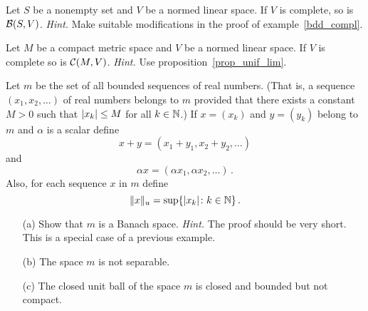 \begin{prob}\label{prob_BSV_compl}  Let $S$ be a nonempty set and $V$ be a normed linear space.
If $V$ is complete, so is $\mathcal{B}(S,V)$.   \emph{Hint.}  Make suitable modifications in the
proof of example~\ref{bdd_compl}.
\end{prob}

\begin{prob}  Let $M$ be a compact metric space and $V$ be a normed linear space.  If $V$ is
complete so is $\mathcal{C}(M,V)$. \emph{Hint.} Use proposition~\ref{prop_unif_lim}.
\end{prob}

\begin{prob} Let $m$ be the set of all bounded sequences of real numbers. (That is, a sequence
$(x_1,x_2,\dots)$ of real numbers belongs to $m$ provided that there exists a constant $M>0$
such that $\lvert x_k\rvert \le M$ for all $k \in \mathbb{N}$.) If $x = (x_k)$ and $y = (y_k)$ belong to $m$
and $\alpha$ is a scalar define
  \[ x + y = (x_1 + y_1,x_2 + y_2,\dots) \]
and
  \[ \alpha x = (\alpha x_1, \alpha x_2, \dots)\,. \]
Also, for each sequence $x$ in $m$ define
  \[ \lVert x\rVert_u = \sup\{\lvert x_k\rvert\colon k \in \mathbb{N} \}\,. \]
 \begin{enumerate}
  \item[(a)] Show that $m$ is a Banach space. \emph{Hint.} The proof should be very short.  This
is a special case of a previous example.
  \item[(b)] The space $m$ is not separable.
  \item[(c)] The closed unit ball of the space $m$ is closed and bounded but not compact.
 \end{enumerate}
\end{prob}













